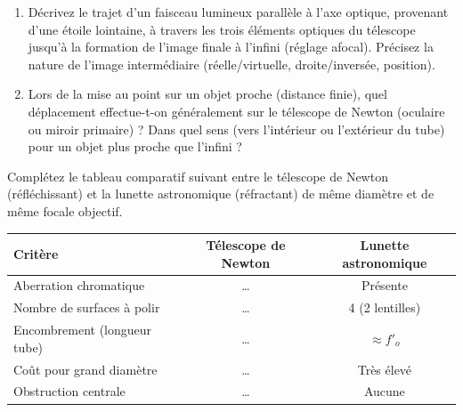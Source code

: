 \documentclass[11pt]{article}
\begin{document}
\begin{exercice}
\label{exo:rayons}
\begin{enumerate}
    \item Décrivez le trajet d'un faisceau lumineux parallèle à l'axe optique, provenant d'une étoile lointaine, à travers les trois éléments optiques du télescope jusqu'à la formation de l'image finale à l'infini (réglage afocal). Précisez la nature de l'image intermédiaire (réelle/virtuelle, droite/inversée, position).
    \item Lors de la mise au point sur un objet proche (distance finie), quel déplacement effectue-t-on généralement sur le télescope de Newton (oculaire ou miroir primaire) ? Dans quel sens (vers l'intérieur ou l'extérieur du tube) pour un objet plus proche que l'infini ?
\end{enumerate}
\end{exercice}

\begin{exercice}
\label{exo:interet}
Complétez le tableau comparatif suivant entre le télescope de Newton (réfléchissant) et la lunette astronomique (réfractant) de même diamètre et de même focale objectif.
\begin{center}
\begin{tabularx}{\linewidth}{|X|c|c|}
\hline
\textbf{Critère} & \textbf{Télescope de Newton} & \textbf{Lunette astronomique} \\
\hline
Aberration chromatique & \ldots & Présente \\
\hline
Nombre de surfaces à polir & \ldots & 4 (2 lentilles) \\
\hline
Encombrement (longueur tube) & \ldots & $\approx f'_o$ \\
\hline
Coût pour grand diamètre & \ldots & Très élevé \\
\hline
Obstruction centrale & \ldots & Aucune \\
\hline
\end{tabularx}
\end{center}
\end{exercice}
\end{document}
